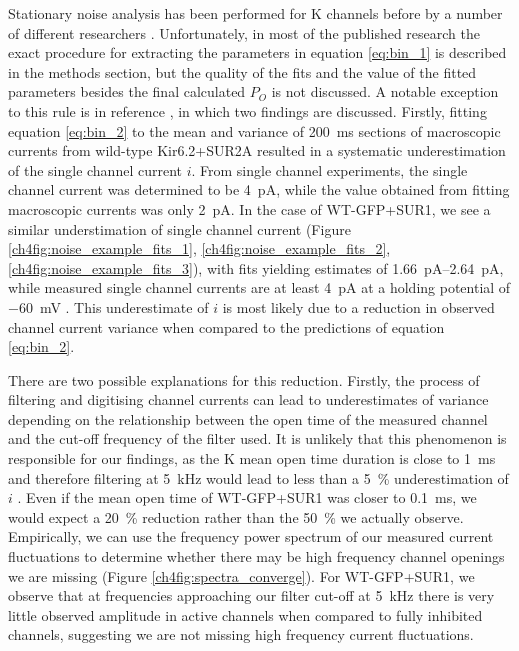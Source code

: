 Stationary noise analysis has been performed for K\ATP{} channels before by a number of different researchers \cite{shyng_control_1997, cukras_role_2002, babenko_sur-dependent_2002, tammaro_mutation_2007, pratt_sulfonylurea_2009, proks_activation_2010-1, pratt_engineered_2012-1}.
Unfortunately, in most of the published research the exact procedure for extracting the parameters in equation \ref{eq:bin_1} is described in the methods section, but the quality of the fits and the value of the fitted parameters besides the final calculated $P_O$ is not discussed.
A notable exception to this rule is in reference \cite{tammaro_mutation_2007}, in which two findings are discussed.
Firstly, fitting equation \ref{eq:bin_2} to the mean and variance of \SI{200}{\milli\second} sections of macroscopic currents from wild-type Kir6.2+SUR2A resulted in a systematic underestimation of the single channel current $i$.
From single channel experiments, the single channel current was determined to be \SI{4}{\pico\ampere}, while the value obtained from fitting macroscopic currents was only \SI{2}{\pico\ampere}.
In the case of WT-GFP+SUR1, we see a similar understimation of single channel current (Figure \ref{ch4fig:noise_example_fits_1}, \ref{ch4fig:noise_example_fits_2}, \ref{ch4fig:noise_example_fits_3}), with fits yielding estimates of \SIrange{1.66}{2.64}{\pico\ampere}, while measured single channel currents are at least \SI{4}{\pico\ampere} at a holding potential of \SI{-60}{\milli\volt} \cite{shyng_control_1997, proks_mutations_2001}.
This underestimate of $i$ is most likely due to a reduction in observed channel current variance when compared to the predictions of equation \ref{eq:bin_2}. 

There are two possible explanations for this reduction.
Firstly, the process of filtering and digitising channel currents can lead to underestimates of variance depending on the relationship between the open time of the measured channel and the cut-off frequency of the filter used.
It is unlikely that this phenomenon is responsible for our findings, as the K\ATP{} mean open time duration is close to \SI{1}{\milli\second} and therefore filtering at \SI{5}{\kilo\hertz} would lead to less than a \SI{5}{\percent} underestimation of $i$ \cite{}.
Even if the mean open time of WT-GFP+SUR1 was closer to \SI{0.1}{\milli\second}, we would expect a \SI{20}{\percent} reduction rather than the \SI{50}{\percent} we actually observe.
Empirically, we can use the frequency power spectrum of our measured current fluctuations to determine whether there may be high frequency channel openings we are missing (Figure \ref{ch4fig:spectra_converge}).
For WT-GFP+SUR1, we observe that at frequencies approaching our filter cut-off at \SI{5}{\kilo\hertz} there is very little observed amplitude in active channels when compared to fully inhibited channels, suggesting we are not missing high frequency current fluctuations.

